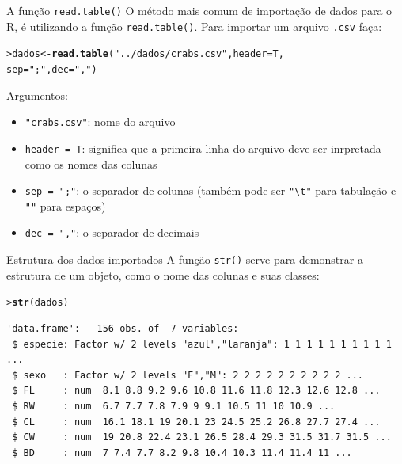 \documentclass[10pt]{beamer}\usepackage[]{graphicx}\usepackage[]{color}
\makeatletter
\newcommand{\hlstr}[1]{\textcolor[rgb]{0.282,0.239,0.545}{#1}}%
\newcommand{\hlstd}[1]{\textcolor[rgb]{0.345,0.345,0.345}{#1}}%
\newcommand{\hlkwb}[1]{\textcolor[rgb]{0.69,0.353,0.396}{#1}}%
\newcommand{\hlkwc}[1]{\textcolor[rgb]{0.333,0.667,0.333}{#1}}%
\newcommand{\hlkwd}[1]{\textcolor[rgb]{0.282,0.239,0.545}{\textbf{#1}}}%
\newenvironment{kframe}{%
 \def\at@end@of@kframe{}%
 \ifinner\ifhmode%
  \def\at@end@of@kframe{\end{minipage}}%
  \begin{minipage}{\columnwidth}%
 \fi\fi%
 \def\FrameCommand##1{\hskip\@totalleftmargin \hskip-\fboxsep
 \colorbox{shadecolor}{##1}\hskip-\fboxsep
     \hskip-\linewidth \hskip-\@totalleftmargin \hskip\columnwidth}%
 \MakeFramed {\advance\hsize-\width
   \@totalleftmargin\z@ \linewidth\hsize
   \@setminipage}}%
 {\par\unskip\endMakeFramed%
 \at@end@of@kframe}
\newenvironment{knitrout}{}{} %
\makeatother
\begin{document}
\begin{frame}[fragile=singleslide]{A função \texttt{read.table()}}
O método mais comum de importação de dados para o R, é utilizando a
função \texttt{read.table()}. Para importar um arquivo \texttt{.csv}
faça:
\begin{knitrout}\small
{}\color{fgcolor}\begin{kframe}
\begin{alltt}
\hlstd{> }\hlstd{dados} \hlkwb{<-} \hlkwd{read.table}\hlstd{(}\hlstr{"../dados/crabs.csv"}\hlstd{,} \hlkwc{header} \hlstd{= T,}
\hlstd{  }                    \hlkwc{sep} \hlstd{=} \hlstr{";"}\hlstd{,} \hlkwc{dec} \hlstd{=} \hlstr{","}\hlstd{)}
\end{alltt}
\end{kframe}
\end{knitrout}

Argumentos:
\begin{itemize}
\item \verb|"crabs.csv"|: nome do arquivo
\item \texttt{header = T}: significa que a primeira linha do arquivo deve
  ser inrpretada como os nomes das colunas
\item \texttt{sep = ";"}: o separador de colunas (também pode ser
  \verb|"\t"| para tabulação e \verb|""| para espaços)
\item \texttt{dec = ","}: o separador de decimais
\end{itemize}
\end{frame}

\begin{frame}[fragile=singleslide]{Estrutura dos dados importados}
A função \texttt{str()} serve para demonstrar a estrutura de um objeto,
como o nome das colunas e suas classes:
\begin{knitrout}\small
{}\color{fgcolor}\begin{kframe}
\begin{alltt}
\hlstd{> }\hlkwd{str}\hlstd{(dados)}
\end{alltt}
\begin{verbatim}
'data.frame':	156 obs. of  7 variables:
 $ especie: Factor w/ 2 levels "azul","laranja": 1 1 1 1 1 1 1 1 1 1 ...
 $ sexo   : Factor w/ 2 levels "F","M": 2 2 2 2 2 2 2 2 2 2 ...
 $ FL     : num  8.1 8.8 9.2 9.6 10.8 11.6 11.8 12.3 12.6 12.8 ...
 $ RW     : num  6.7 7.7 7.8 7.9 9 9.1 10.5 11 10 10.9 ...
 $ CL     : num  16.1 18.1 19 20.1 23 24.5 25.2 26.8 27.7 27.4 ...
 $ CW     : num  19 20.8 22.4 23.1 26.5 28.4 29.3 31.5 31.7 31.5 ...
 $ BD     : num  7 7.4 7.7 8.2 9.8 10.4 10.3 11.4 11.4 11 ...
\end{verbatim}
\end{kframe}
\end{knitrout}

\end{frame}
\end{document}
